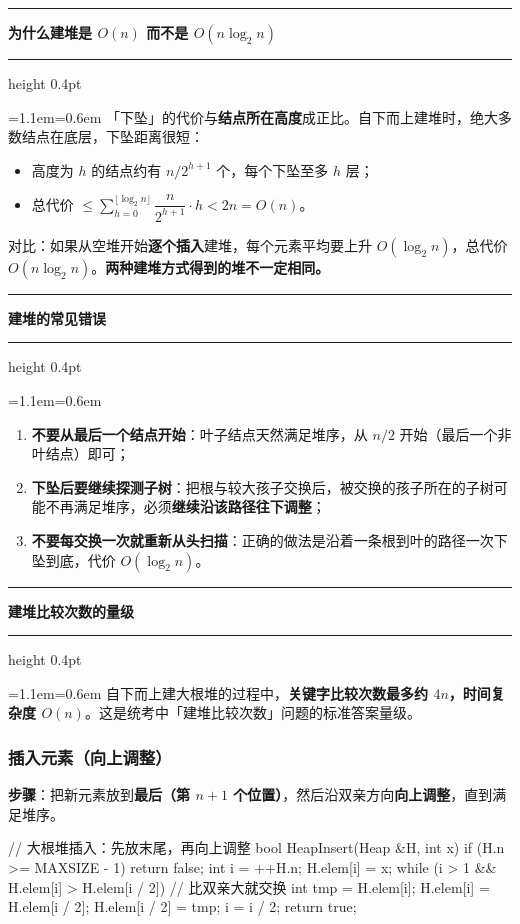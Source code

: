\documentclass[11pt,openany,UTF8]{ctexbook}
\newcommand{\callouthead}[2]{%
  \par\addvspace{7pt}\noindent
  {\color{#1}\rule[-0.15em]{3pt}{1.05em}}\hspace{0.5em}%
  {\bfseries\color{#1}#2}\par\nobreak\vspace{-0.35em}%
  {\color{rulesep}\hrule height 0.4pt}\nobreak\vspace{0.45em}%
  \begingroup\small\setlength{\parindent}{0pt}%
  \leftskip=1.1em\rightskip=0.6em\noindent\ignorespaces}
\newcommand{\calloutend}{\par\endgroup\addvspace{7pt}}
\newenvironment{callkey}[1]{\callouthead{keybar}{#1}}{\calloutend}
\newenvironment{callwarn}[1]{\callouthead{warnbar}{#1}}{\calloutend}
\begin{document}
\begin{callkey}{为什么建堆是 $O(n)$ 而不是 $O(n\log_2 n)$}
「下坠」的代价与\textbf{结点所在高度}成正比。自下而上建堆时，绝大多数结点在底层，下坠距离很短：

\begin{itemize}
\item 高度为 $h$ 的结点约有 $n/2^{h+1}$ 个，每个下坠至多 $h$ 层；
\item 总代价 $\le\sum\limits_{h=0}^{\lfloor\log_2 n\rfloor}\dfrac{n}{2^{h+1}}\cdot h<2n=O(n)$。
\end{itemize}
对比：如果从空堆开始\textbf{逐个插入}建堆，每个元素平均要上升 $O(\log_2 n)$，总代价 $O(n\log_2 n)$。\textbf{两种建堆方式得到的堆不一定相同。}

\end{callkey}

\begin{callwarn}{建堆的常见错误}
\begin{enumerate}
\item \textbf{不要从最后一个结点开始}：叶子结点天然满足堆序，从 $n/2$ 开始（最后一个非叶结点）即可；
\item \textbf{下坠后要继续探测子树}：把根与较大孩子交换后，被交换的孩子所在的子树可能不再满足堆序，必须\textbf{继续沿该路径往下调整}；
\item \textbf{不要每交换一次就重新从头扫描}：正确的做法是沿着一条根到叶的路径一次下坠到底，代价 $O(\log_2 n)$。
\end{enumerate}
\end{callwarn}

\begin{callkey}{建堆比较次数的量级}
自下而上建大根堆的过程中，\textbf{关键字比较次数最多约 $4n$，时间复杂度 $O(n)$}。这是统考中「建堆比较次数」问题的标准答案量级。

\end{callkey}

\subsubsection{插入元素（向上调整）}

\textbf{步骤}：把新元素放到\textbf{最后（第 $n+1$ 个位置）}，然后沿双亲方向\textbf{向上调整}，直到满足堆序。

\begin{codebox}
// 大根堆插入：先放末尾，再向上调整
bool HeapInsert(Heap &H, int x) {
    if (H.n >= MAXSIZE - 1) return false;
    int i = ++H.n;
    H.elem[i] = x;
    while (i > 1 && H.elem[i] > H.elem[i / 2]) {  // 比双亲大就交换
        int tmp = H.elem[i];
        H.elem[i] = H.elem[i / 2];
        H.elem[i / 2] = tmp;
        i = i / 2;
    }
    return true;
}
\end{codebox}
\end{document}
